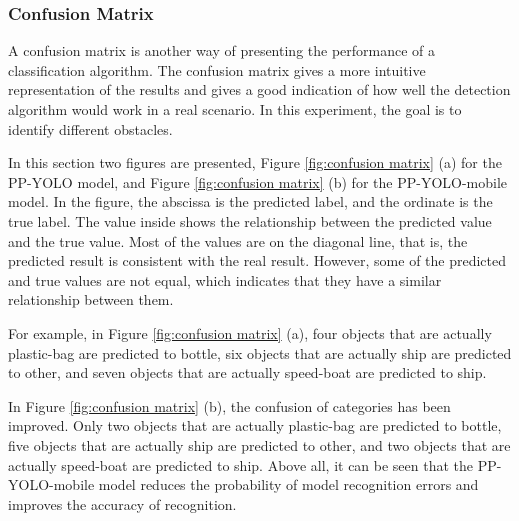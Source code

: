 \documentclass[journal,article,submit,moreauthors,pdftex]{Definitions/mdpi}
\begin{document}
\subsubsection{Confusion Matrix}
A confusion matrix is another way of presenting the performance of a classification algorithm. The confusion matrix gives a more intuitive representation of the results and gives a good indication of how well the detection algorithm would work in a real scenario. In this experiment, the goal is to identify different obstacles.

In this section two figures are presented, Figure \ref{fig:confusion matrix} (a) for the PP-YOLO model, and Figure \ref{fig:confusion matrix} (b) for the PP-YOLO-mobile model. In the figure, the abscissa is the predicted label, and the ordinate is the true label. The value inside shows the relationship between the predicted value and the true value. Most of the values are on the diagonal line, that is, the predicted result is consistent with the real result. However, some of the predicted and true values are not equal, which indicates that they have a similar relationship between them.

For example, in Figure \ref{fig:confusion matrix} (a), four objects that are actually plastic-bag are predicted to bottle, six objects that are actually ship are predicted to other, and seven objects that are actually speed-boat are predicted to ship.

In Figure \ref{fig:confusion matrix} (b), the confusion of categories has been improved. Only two objects that are actually plastic-bag are predicted to bottle, five objects that are actually ship are predicted to other, and two objects that are actually speed-boat are predicted to ship. Above all, it can be seen that the PP-YOLO-mobile model reduces the probability of model recognition errors and improves the accuracy of recognition.
\end{document}
